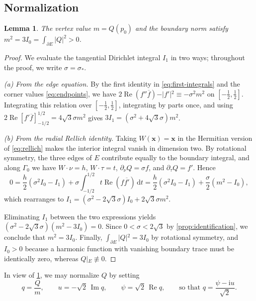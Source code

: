\documentclass[11pt,reqno]{amsart}
\numberwithin{equation}{section}
\newtheorem{lemma}[lemma]{Lemma}
\theoremstyle{remark}
\newcommand{\dd}{\,\mathrm d}
\newcommand{\ii}{\mathrm i}
\DeclareMathOperator{\Rea}{Re}
\DeclareMathOperator{\Ima}{Im}
\begin{document}
\subsection{Normalization}
\begin{lemma}\label{lem:mass}
The vertex value $m=Q(p_0)$ and the boundary norm satisfy
$m^2=3I_0=\int_{\partial E}|Q|^2>0$.
\end{lemma}
\begin{proof}
We evaluate the tangential Dirichlet integral $I_1$ in two ways; throughout the
proof, we write $\sigma=\sigma_*$.

\emph{(a) From the edge equation.} By the first identity in
\eqref{eq:first-integrals} and the corner values \eqref{eq:endpoints}, we have
$2\Rea(f''\overline f)-\vert{}f'\vert{}^2\equiv-\sigma^2m^2$ on $[-\frac12,\frac12]$.
Integrating this relation over $[-\frac12,\frac12]$, integrating by parts once,
and using $2\Rea[f'\overline f]_{-1/2}^{1/2}=4\sqrt3\sigma m^2$ gives
$3I_1=(\sigma^2+4\sqrt3\sigma)m^2$.

\emph{(b) From the radial Rellich identity.} Taking $W(\mathbf x)=\mathbf x$
in the Hermitian version of \eqref{eq:rellich} makes the interior integral vanish
in dimension two. By rotational symmetry, the three edges of $E$ contribute
equally to the boundary integral, and along $\Gamma_0$ we have $W\cdot\nu=h$,
$W\cdot\tau=t$, $\partial_\nu Q=\sigma f$, and $\partial_\tau Q=f'$. Hence
\[0=\frac h2(\sigma^2I_0-I_1)+\sigma\int_{-1/2}^{1/2}t\Rea(f\overline{f'})\dd t =\frac h2(\sigma^2I_0-I_1)+\frac\sigma2(m^2-I_0),\]
which rearranges to $I_1=(\sigma^2-2\sqrt3\sigma)I_0+2\sqrt3\sigma m^2$.

Eliminating $I_1$ between the two expressions yields
$(\sigma^2-2\sqrt3\sigma)(m^2-3I_0)=0$. Since $0<\sigma<2\sqrt3$ by
\cref{prop:identification}, we conclude that $m^2=3I_0$. Finally,
$\int_{\partial E}\vert{}Q\vert{}^2=3I_0$ by rotational symmetry, and $I_0>0$
because a harmonic function with vanishing boundary trace must be identically
zero, whereas $Q\vert{}_E\not\equiv0$.
\end{proof}

In view of \cref{lem:mass}, we may normalize $Q$ by setting
\begin{equation}\label{eq:u-psi}
 q=\frac Qm,\qquad u=-\sqrt2\,\Ima q,\qquad \psi=\sqrt2\,\Rea q,
 \qquad\text{so that } q=\frac{\psi-\ii u}{\sqrt2}.
\end{equation}
\end{document}
